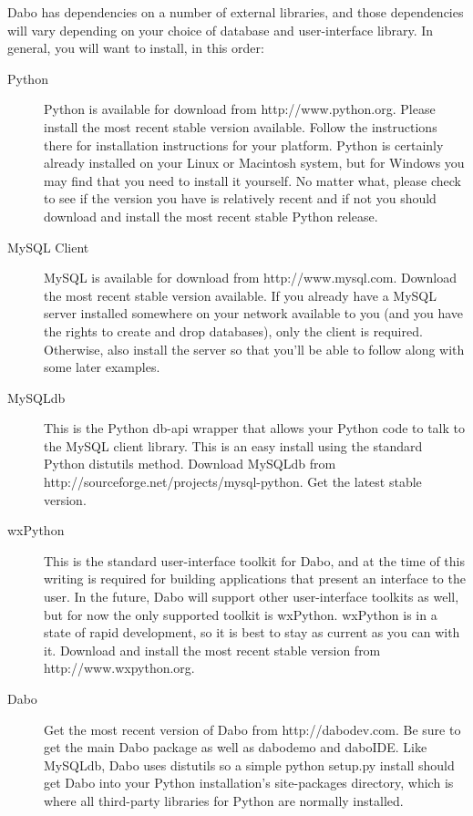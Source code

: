 Dabo has dependencies on a number of external libraries, and those dependencies will vary depending on your choice of database and user-interface library. In general, you will want to install, in this order:
\begin{description}
	\item[Python] Python is available for download from http://www.python.org.  Please install the most recent stable version available. Follow the instructions there for installation instructions for your platform. Python is certainly already installed on your Linux or Macintosh system, but for Windows you may find that you need to install it yourself. No matter what, please check to see if the version you have is relatively recent and if not you should download and install the most recent stable Python release.

	\item[MySQL Client] MySQL is available for download from http://www.mysql.com. Download the most recent stable version available. If you already have a MySQL server installed somewhere on your network available to you (and you have the rights to create and drop databases), only the client is required. Otherwise, also install the server so that you'll be able to follow along with some later examples.

	\item[MySQLdb] This is the Python db-api wrapper that allows your Python code to talk to the MySQL client library. This is an easy install using the standard Python distutils method. Download MySQLdb from http://sourceforge.net/projects/mysql-python. Get the latest stable version.

	\item[wxPython] This is the standard user-interface toolkit for Dabo, and at the time of this writing is required for building applications that present an interface to the user. In the future, Dabo will support other user-interface toolkits as well, but for now the only supported toolkit is wxPython. wxPython is in a state of rapid development, so it is best to stay as current as you can with it. Download and install the most recent stable version from http://www.wxpython.org.

	\item[Dabo] Get the most recent version of Dabo from http://dabodev.com. Be sure to get the main Dabo package as well as dabodemo and daboIDE. Like MySQLdb, Dabo uses distutils so a simple python setup.py install should get Dabo into your Python installation's site-packages directory, which is where all third-party libraries for Python are normally installed.
\end{description}

